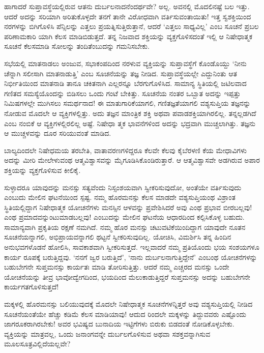 ಹಾಗಾದರೆ ಸುಪ್ತಾವಸ್ಥೆಯಲ್ಲಿರುವ ಆತನು ದುರ್ಬಲನಾದನೆಂದರ್ಥವೇ? ಅಲ್ಲ. ಅವನಲ್ಲಿ ಮೊದಲಿನಷ್ಟೆ ಬಲ ಇತ್ತು. ಆದರೆ ಅದನ್ನು ಸರಿಯಾಗಿ ಅರಿತುಕೊಳ್ಳದೇ ತನಗೆ ತಾನೇ ವಿರೋಧವಾಗಿ ವರ್ತಿಸುವಂತಾಯಿತು! ಇತ್ತ ಸ್ವಶಕ್ತಿಯಿಂದ ನರಗಳನ್ನು ಬಿಗಿಗೊಳಿಸಿ ಪೆನ್ಸಿಲನ್ನು ಎತ್ತಲು ಪ್ರಯತ್ನಿಸುತ್ತಿರುತ್ತಾನೆ, ಆದರೆ ‘ಎತ್ತಲು ಸಾಧ್ಯವಿಲ್ಲ’ ಎಂಬ ಸೂಚನೆ ಪ್ರಬಲ ಪರಿಣಾಮಕಾರಿ ಯಾಗಿ ಕೆಲಸ ಮಾಡಿಬಿಡುತ್ತದೆ. ತನ್ನ ನಿಜವಾದ ಶಕ್ತಿಯನ್ನು ವ್ಯಕ್ತಗೊಳಿಸದಂತೆ ಇಲ್ಲಿ ಆ ನಿಷೇಧಾತ್ಮಕ ಸೂಚನೆ ಕೆಲಸಮಾಡಿ ಸೋಲನ್ನು ತಂದಿತೆಂಬುದನ್ನು ಗಮನಿಸಬೇಕು.

ಸಭೆಯಲ್ಲಿ ಮಾತನಾಡಲು ಅಂಜುವ, ಸಭಾಕಂಪದಿಂದ ನರಳುವ ವ್ಯಕ್ತಿಯನ್ನು ಸುಪ್ತಾವಸ್ಥೆಗೆ ಕೊಂಡೊಯ್ದು ‘ನೀನು ಚೆನ್ನಾಗಿ ಸಲೀಸಾಗಿ ಮಾತನಾಡುತ್ತಿ’ ಎಂಬ ಸೂಚನೆಯನ್ನು ತಜ್ಞ ನೀಡಿದ. ಸುಪ್ತಾವಸ್ಥೆಯಲ್ಲೇ ಎದ್ದುನಿಂತು ಆತ ನಿರ್ಭೀತಿಯಿಂದ ಮಾತನಾಡಿ ತಾನೂ ಚಕಿತನಾಗಿ ಎಲ್ಲರನ್ನೂ ಬೆರಗುಗೊಳಿಸಿದ. ಸಾಮಾನ್ಯ ಸ್ಥಿತಿಯಲ್ಲಿ ಜಟಿಲವಾದ ಗಣಿತದ ಸಮಸ್ಯೆಯೊಂದನ್ನು ಬಿಡಿಸಲು ಒಂದು ಗಂಟೆ ಬೇಕಿತ್ತು. ಸೂಚನೆಯ ನಂತರ ಒಬ್ಬಾತ ಅದನ್ನು ಇಪ್ಪತ್ತು ನಿಮಿಷಗಳಲ್ಲೇ ಮುಗಿಸಲು ಸಮರ್ಥನಾದ! ಈ ಮಾತುಗಾರಿಕೆಯಾಗಲಿ, ಗಣಿತಜ್ಞತೆಯಾಗಲಿ ವಶ್ಯಸುಪ್ತಿಯ ತಜ್ಞನನ್ನು ನೋಡುವ ಮೊದಲೇ ಆ ವ್ಯಕ್ತಿಗಳಲ್ಲಿತ್ತು. ಅದು ತಜ್ಞನ ಮಾಂತ್ರಿಕ ಶಕ್ತಿ ಅಥವಾ ಪವಾಡಶಕ್ತಿಯಾಗಿರಲಿಲ್ಲ. ತನ್ನಲ್ಲಡಗಿದೆ ಎಂಬ ನಂಬಿಕೆ ಆ ವ್ಯಕ್ತಿಗಳಲ್ಲಿರಲಿಲ್ಲ ಅಷ್ಟೆ. ನಿಷೇಧಾ ತ್ಮಕ ಭಾವನೆಗಳಿಂದ ಅದನ್ನು ಭದ್ರವಾಗಿ ಮುಚ್ಚಲಾಗಿತ್ತು. ತಜ್ಞನು ಆ ಮುಚ್ಚಳವನ್ನು ದೂರ ಸರಿಯುವಂತೆ ಮಾಡಿದ.

ಬಾಲ್ಯದಿಂದಲೇ ನಿಷೇಧಮಯ ತರಬೇತಿ, ವಾತಾವರಣಗಳಿದ್ದರೂ ಕೆಲವೇ ಕೆಲವು ಕೈಬೆರಳಣಿ ಕೆಯ ಮೇಧಾವಿಗಳು ಅದನ್ನು ಮೀರಿ ಮೇಲೇಳುವಂಥ ಆತ್ಮವಿಶ್ವಾಸವನ್ನು ಮೈಗೂಡಿಸಿ\-ಕೊಂಡಿರು\-ತ್ತಾರೆ. ಆ ಆತ್ಮವಿಶ್ವಾಸವೇ ಅಡಗಿರುವ ಅಪಾರ ಶಕ್ತಿಯನ್ನು ವ್ಯಕ್ತಗೊಳಿಸುವ ಕೀಲಿಕೈ.

ಸುಳ್ಳಾದರೂ ಯಾವುದನ್ನು ಮನಸ್ಸು ಸತ್ಯವೆಂದು ನಿಸ್ಸಂಶಯವಾಗಿ ಸ್ವೀಕರಿಸುವುದೋ, ಅಂತೆಯೇ ವರ್ತಿಸುವುದು ಎಂಬುದು ಮೇಲಿನ ಘಟನೆಯಿಂದ ಸ್ಪಷ್ಟ. ನಮ್ಮ ಹೊರಮನಸ್ಸು ಕೆಲಸ ಮಾಡದೇ ವಶ್ಯಸುಪ್ತಿಯಂಥ ವಿಶ್ರಾಂತ ಸ್ಥಿತಿಯಲ್ಲಿದ್ದಾಗ ನಿಷೇಧಾತ್ಮಕ ಯೋಚನೆಗಳು ಮನಸ್ಸಿನ ಆಳವನ್ನು ಪ್ರವೇಶಿಸಿದರೆ ಅವು ಎಂಥ ಪ್ರಭಾವ ಬೀರಬಲ್ಲವು! ಎಂಥ ಪ್ರಮಾದ\-ವನ್ನುಂಟು\-ಮಾಡ\-ಬಲ್ಲವು! ಎಂಬುದನ್ನು ಮೇಲಿನ ಘಟನೆಯ ಆಧಾರದಿಂದ ಕಲ್ಪಿಸಿಕೊಳ್ಳ ಬಹುದು. ಸಾಮಾನ್ಯವಾಗಿ ಪ್ರಕೃತಿಯ ರಕ್ಷಣೆ ನಮಗಿದೆ. ನಮ್ಮ ಹೊರ ಮನಸ್ಸು ಚಟುವಟಿಕೆಯಿಂದಿದ್ದಾಗ ಯಾವುದೇ ನೂತನ ಸೂಚನೆಯನ್ನಾಗಲಿ, ಅಭಿಪ್ರಾಯವನ್ನಾಗಲಿ ಥಟ್ಟನೆ ಸ್ವೀಕರಿಸುವುದಿಲ್ಲ. ಯೋಚಿಸಿ, ವಿಮರ್ಶಿಸಿ ತನ್ನ ಹಿಂದಿನ ಅನುಭವಗಳೊಡನೆ ಹೋಲಿಸಿ, ಸಾವಕಾಶವಾಗಿ ಸ್ವೀಕರಿಸುತ್ತದೆ. ಇಲ್ಲವಾದರೆ ನಮ್ಮ ಪ್ರತಿಯೊಂದು ಭಯ ಸಂಶಯಗಳೂ ಕಾರ್ಯ ರೂಪಕ್ಕೆ ಬರುತ್ತಿದ್ದವು. ‘ನನಗೆ ಜ್ವರ ಬರುತ್ತಿದೆ’, ‘ನಾನು ದುರ್ಬಲನಾಗುತ್ತಿದ್ದೇನೆ’ ಎಂಬಂಥ ಯೋಚನೆಗಳನ್ನು ಬಹುಬೇಗನೇ ಸುಪ್ತಮನಸ್ಸು ಕಾರ್ಯತಃ ಮಾಡಿ ತೋರಿಸುತ್ತಿತ್ತು. ಆದರೆ ನಮ್ಮ ಎಚ್ಚರದ ಮನಸ್ಸು ಒಂದೇ ಯೋಚನೆಯನ್ನು ತೀವ್ರ ಭಾವೋದ್ವೇಗದಿಂದ, ಭಯದಿಂದ ಮೆಲುಕಾಡುತ್ತಿದ್ದರೆ ಸುಪ್ತಮನಸ್ಸು ಅದನ್ನು ಬಹುಬೇಗನೇ ಕಾರ್ಯಗತಗೊಳಿಸುತ್ತದೆ!

ಮಕ್ಕಳಲ್ಲಿ ಹೊರಮನಸ್ಸು ಬಲಿಯುವುದಕ್ಕೆ ಮೊದಲೇ ನಿಷೇಧಾತ್ಮಕ ಸೂಚನೆಗಳನ್ನಿತ್ತರೆ ಅವು ವಶ್ಯಸುಪ್ತಿಯಲ್ಲಿ ನೀಡಿದ ಸೂಚನೆಯಂತೆಯೇ ಹೆಚ್ಚು ಕಡಿಮೆ ಕೆಲಸ ಮಾಡಿಯಾವು! ಆದುದ ರಿಂದಲೇ ಮಕ್ಕಳನ್ನು ತಿದ್ದುವವರು ಎಷ್ಟೊಂದು ಜಾಗರೂಕರಾಗಿರಬೇಕು! ಅವರ ಭವಿಷ್ಯದ ಬುನಾದಿಯ ಇಟ್ಟಿಗೆಗಳು ಬಿರುಕು ಬಿಡದಂತೆ ನೋಡಿಕೊಳ್ಳಬೇಕು. ವ್ಯಕ್ತಿಯನ್ನು ಮಾತ್ರವಲ್ಲ, ಒಂದು ಜನಾಂಗವನ್ನೇ ದುರ್ಬಲಗೊಳಿಸುವ ಅಥವಾ ಸಶಕ್ತವನ್ನಾಗಿಸುವ ಮೂಲಸೂತ್ರವಿಲ್ಲಿದೆಯಲ್ಲವೇ?

